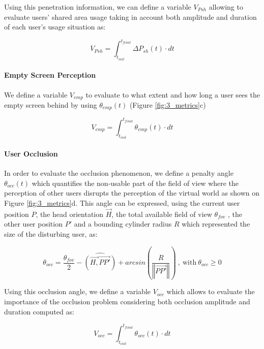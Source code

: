 Using this penetration information, we can define a variable $V_{Psh}$ allowing to evaluate users' shared area usage taking in account both amplitude and duration of each user's usage situation as:

\begin{equation}
V_{Psh}=\int_{t_{init}}^{t_{final}}\Delta P_{sh}(t)\cdot dt
\end{equation}

\paragraph{\textbf{Empty Screen Perception}}
We define a variable $V_{emp}$ to evaluate to what extent and how long a user sees the empty screen behind by using $\theta_{emp}(t)$ (Figure \ref{fig:3_metrics}c)

\begin{equation}
V_{emp}=\int_{t_{init}}^{t_{final}}\theta_{emp}(t)\cdot dt
\end{equation}

\paragraph{\textbf{User Occlusion}}
In order to evaluate the occlusion phenomenon, we define a penalty angle $\theta_{occ}(t)$ which quantifies the non-usable part of the field of view where the perception of other users disrupts the perception of the virtual world as shown on Figure \ref{fig:3_metrics}d. This angle can be expressed, using the current user position $P$, the head orientation $\overrightarrow{H}$, the total available field of view $\theta_{fov}$ , the other user position $P'$ and a bounding cylinder radius $R$ which represented the size of the disturbing user, as:

\begin{equation}
\theta_{occ}=\frac{\theta_{fov}}{2}-\widehat{(\overrightarrow{H,}\overrightarrow{PP'})}+arcsin(\frac{R}{\left\Vert \overrightarrow{PP'}\right\Vert })\mathrm{\:,\: with\:}\theta_{occ}\geq0
\end{equation}

Using this occlusion angle, we define a variable $V_{occ}$ which allows to evaluate the importance of the occlusion problem considering both occlusion amplitude and duration computed as:

\begin{equation}
V_{occ}=\int_{t_{init}}^{t_{final}}\theta_{occ}(t)\cdot dt
\end{equation}


